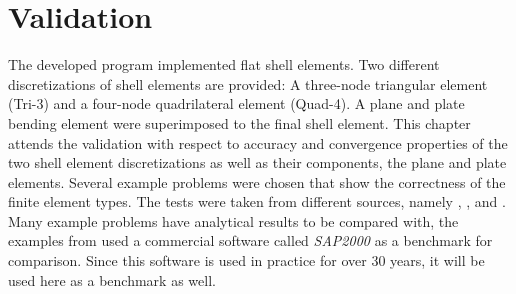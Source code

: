 \section{Validation}\label{sec:valid}
The developed program implemented flat shell elements. Two different discretizations of shell elements are provided: A three-node triangular element (Tri-3) and a four-node quadrilateral element (Quad-4). A plane and plate bending element were superimposed to the final shell element. This chapter attends the validation with respect to accuracy and convergence properties of the two shell element discretizations as well as their components, the plane and plate elements. Several example problems were chosen that show the correctness of the finite element types. The tests were taken from different sources, namely \cite{kansara2004development}, \cite{macneal1985proposed}, \cite{wilson1996three} and \cite{jin1994analysis}. Many example problems have analytical results to be compared with, the examples from \cite{kansara2004development} used a commercial software called \textit{SAP2000} \cite{sap-2000} as a benchmark for comparison. Since this software is used in practice for over 30 years, it will be used here as a benchmark as well.
